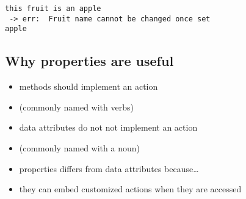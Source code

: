 \documentclass[11pt]{article}
\providecommand{\tightlist}{%
      \setlength{\itemsep}{0pt}\setlength{\parskip}{0pt}}
\begin{document}
    \begin{Verbatim}[commandchars=\\\{\}]
this fruit is an apple
 -> err:  Fruit name cannot be changed once set
apple
    \end{Verbatim}

    \hypertarget{why-properties-are-useful}{%
\subsection{Why properties are useful}\label{why-properties-are-useful}}

\begin{itemize}
\tightlist
\item
  methods should implement an action
\item
  (commonly named with verbs)
\item
  data attributes do not not implement an action
\item
  (commonly named with a noun)
\item
  properties differs from data attributes because\ldots{}
\item
  they can embed customized actions when they are accessed
\end{itemize}
\end{document}
